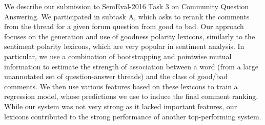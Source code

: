 We describe our submission to SemEval-2016 Task 3 on Community Question Answering. We participated in subtask A, which asks to rerank the comments from the thread for a given forum question from good to bad. Our approach focuses on the generation and use of goodness polarity lexicons, similarly to the sentiment polarity lexicons, which are very popular in sentiment analysis. In particular, we use a combination of bootstrapping and pointwise mutual information to estimate the strength of association between a word (from a large unannotated set of question-answer threads) and the class of good/bad comments. We then use various features based on these lexicons to train a regression model, whose predictions we use to induce the final comment ranking. While our system was not very strong as it lacked important features, our lexicons contributed to the strong performance of another top-performing system.

